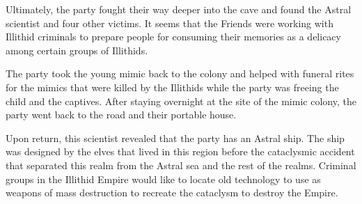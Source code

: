 Ultimately, the party fought their way deeper into the cave and found the Astral scientist and four other victims.
It seems that the Friends were working with Illithid criminals to prepare people for consuming their memories as a delicacy among certain groups of Illithids.

The party took the young mimic back to the colony and helped with funeral rites for the mimics that were killed by the Illithids while the party was freeing the child and the captives.
After staying overnight at the site of the mimic colony, the party went back to the road and their portable house.

Upon return, this scientist revealed that the party has an Astral ship.
The ship was designed by the elves that lived in this region before the cataclysmic accident that separated this realm from the Astral sea and the rest of the realms.
Criminal groups in the Illithid Empire would like to locate old technology to use as weapons of mass destruction to recreate the cataclysm to destroy the Empire.
